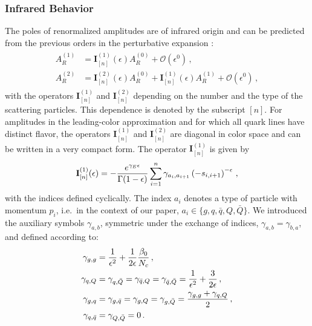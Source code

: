 \subsubsection{Infrared Behavior}

The poles of renormalized amplitudes are of infrared origin and
can be predicted from the previous orders in the perturbative 
expansion 
\cite{Catani:1998bh,Sterman:2002qn,Becher:2009cu,Gardi:2009qi}:
\begin{align}
  \begin{split}\label{eq:catani}
    A_R^{(1)}&=\mathbf{I}^{(1)}_{[n]}(\epsilon)
    A_R^{(0)}+\mathcal{O}
    (\epsilon^0)\,,\\
    A_R^{(2)}&=\mathbf{I}^{(2)}_{[n]}(\epsilon)A_R^{(0)}+\mathbf{I}^{(1)}_{[n]}(\epsilon)
    A_R^{(1)}+\mathcal{O}(\epsilon^0)\,,
  \end{split}
\end{align}
with the operators $\mathbf{I}^{(1)}_{[n]}$ and
$\mathbf{I}^{(2)}_{[n]}$ depending on the number and the type of
the scattering particles. This dependence is denoted by the 
subscript $[n]$.
For amplitudes in the leading-color approximation and for which
all quark lines have distinct flavor, the operators
$\mathbf{I}^{(1)}_{[n]}$ and $\mathbf{I}^{(2)}_{[n]}$ are 
diagonal in color space and can be written in a very compact
form. The operator $\mathbf{I}^{(1)}_{[n]}$ is given by
%
\begin{equation}
  \mathbf{I}^{(1)}_{[n]}(\epsilon)=-\frac{e^{\gamma_E\epsilon}}{\Gamma(1-\epsilon)}
  \sum_{i=1}^n\gamma_{a_i,a_{i+1}}
  \left( -s_{i,i+1}\right)^{-\epsilon}\,,
\end{equation}
with the indices defined cyclically.
The index $a_i$ denotes a type of particle with momentum $p_i$, i.e.\  in the context of our paper,
$a_i\in\{g,q,\bar q, Q, \bar Q\}$. We introduced the auxiliary symbols $\gamma_{a,b}$, 
symmetric under the exchange of indices, 
$\gamma_{a,b}=\gamma_{b,a}$, and defined according to:
\begin{align}
  \begin{split}
    \gamma_{g,g}&=\frac{1}{\epsilon^2}+\frac{1}{2\epsilon}
    \frac{\beta_0}{{N_c}}\,, \\
    \gamma_{q,Q}&=\gamma_{q,\bar Q}=
    \gamma_{\bar q, Q}=\gamma_{\bar q, \bar Q} 
    =\frac{1}{\epsilon^2}+\frac{3}{2\epsilon}\,,\\
    \gamma_{g,q}&=\gamma_{g,\bar q}=
    \gamma_{g,Q}=\gamma_{g,\bar Q}=
    \frac{\gamma_{g,g}+\gamma_{q,Q}}{2}\,,\\
    \gamma_{q,\bar q}&=\gamma_{Q,\bar Q}=0\,.
  \end{split}
\end{align}
